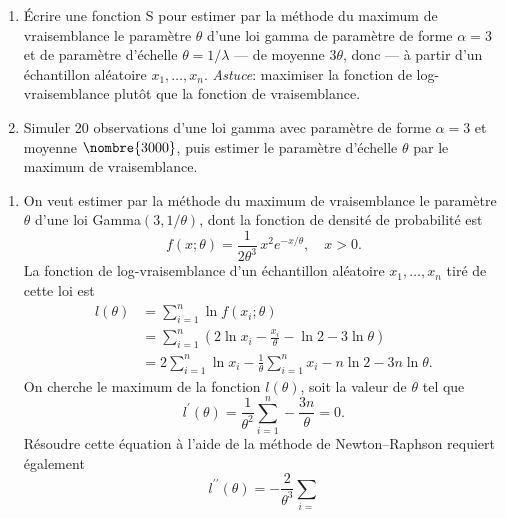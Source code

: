 \begin{exercice}
  \label{ex:resolution:gamma}
  \begin{enumerate}
  \item Écrire une fonction S pour estimer par la méthode du maximum
    de vraisemblance le paramètre $\theta$ d'une loi gamma de
    paramètre de forme $\alpha = 3$ et de paramètre d'échelle $\theta
    = 1/\lambda$ --- de moyenne $3 \theta$, donc --- à partir d'un
    échantillon aléatoire $x_1, \dots, x_n$. \emph{Astuce}: maximiser
    la fonction de log-vraisemblance plutôt que la fonction de
    vraisemblance.
  \item Simuler 20 observations d'une loi gamma avec paramètre de
    forme $\alpha = 3$ et moyenne $\nombre{3000}$, puis estimer le
    paramètre d'échelle $\theta$ par le maximum de vraisemblance.
  \end{enumerate}
  \begin{sol}
    \begin{enumerate}
    \item On veut estimer par la méthode du maximum de vraisemblance
      le paramètre $\theta$ d'une loi Gamma$(3, 1/\theta)$, dont la
      fonction de densité de probabilité est
      \begin{displaymath}
        f(x; \theta) = \frac{1}{2 \theta^3}\, x^2 e^{-x/\theta}, \quad
        x > 0.
      \end{displaymath}
      La fonction de log-vraisemblance d'un échantillon aléatoire
      $x_1, \dots, x_n$ tiré de cette loi est
      \begin{align*}
        l(\theta)
        &= \sum_{i = 1}^n \ln f(x_i; \theta) \\
        &= \sum_{i = 1}^n
        \left(
          2 \ln x_i - \frac{x_i}{\theta} - \ln 2 - 3 \ln \theta
        \right) \\
        &= 2 \sum_{i = 1}^n \ln x_i - \frac{1}{\theta} \sum_{i = 1}^n
        x_i - n \ln 2 - 3n \ln \theta.
      \end{align*}
      On cherche le maximum de la fonction $l(\theta)$, soit la valeur
      de $\theta$ tel que
      \begin{displaymath}
        l^\prime(\theta) = \frac{1}{\theta^2} \sum_{i = 1}^n -
        \frac{3n}{\theta} = 0.
      \end{displaymath}
      Résoudre cette équation à l'aide de la méthode de
      Newton--Raphson requiert également
      \begin{displaymath}
        l^{\prime\prime}(\theta) = - \frac{2}{\theta^3} \sum_{i =
}
\end{displaymath}
\end{enumerate}
\end{sol}
\end{exercice}
